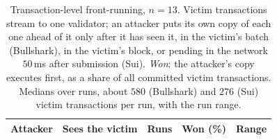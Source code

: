 \begin{table}[t]
\centering\footnotesize
\caption{Transaction-level front-running, $n{=}13$. Victim transactions stream to one validator;
an attacker puts its own copy of each one ahead of it only after it has seen it, in the victim's
batch (Bullshark), in the victim's block, or pending in the network $50$\,ms after submission
(Sui). \emph{Won}: the attacker's copy executes first, as a share of all committed victim
transactions. Medians over runs, about $580$ (Bullshark) and $276$ (Sui) victim transactions per run, with the run range.}
\label{tab:frontrun}
\setlength{\tabcolsep}{4pt}
\begin{tabular}{@{}llrrl@{}}
\toprule
Attacker & Sees the victim & Runs & Won (\%) & Range\\
\midrule
\bottomrule
\end{tabular}
\end{table}
